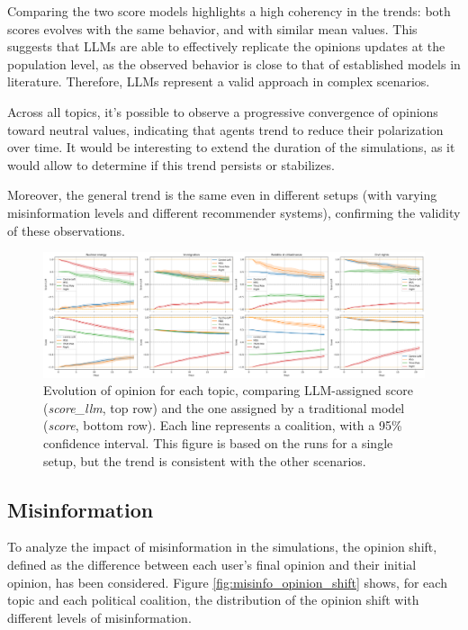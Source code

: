 Comparing the two score models highlights a high coherency in the trends: both scores evolves with the same behavior, and with similar mean values.
This suggests that LLMs are able to effectively replicate the opinions updates at the population level, as the observed behavior is close to that of established models in literature. Therefore, LLMs represent a valid approach in complex scenarios.

Across all topics, it's possible to observe a progressive convergence of opinions toward neutral values, indicating that agents trend to reduce their polarization over time.
It would be interesting to extend the duration of the simulations, as it would allow to determine if this trend persists or stabilizes.

Moreover, the general trend is the same even in different setups (with varying misinformation levels and different recommender systems), confirming the validity of these observations.

\begin{figure}[h]
    \centering
    \includegraphics[width=1\linewidth]{Images/Opinions/d21a100m00d_DefaultRecSys.png}
    \caption{Evolution of opinion for each topic, comparing LLM-assigned score (\textit{score\_llm}, top row) and the one assigned by a traditional model (\textit{score}, bottom row).
    Each line represents a coalition, with a 95\% confidence interval.
    This figure is based on the runs for a single setup, but the trend is consistent with the other scenarios.}
    \label{fig:opinion_evolution}
\end{figure}


\subsection{Misinformation}
To analyze the impact of misinformation in the simulations, the opinion shift, defined as the difference between each user's final opinion and their initial opinion, has been considered.
Figure \ref{fig:misinfo_opinion_shift} shows, for each topic and each political coalition, the distribution of the opinion shift with different levels of misinformation.


